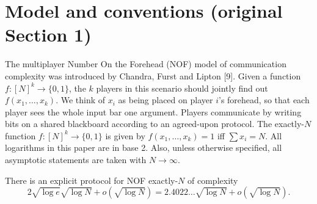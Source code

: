\section*{Model and conventions (original Section 1)}
The multiplayer Number On the Forehead (NOF) model of communication complexity was introduced by Chandra, Furst and Lipton [9]. Given a function $f:[N]^k\to\{0,1\}$, the $k$ players in this scenario should jointly find out $f(x_1,\ldots,x_k)$. We think of $x_i$ as being placed on player $i$'s forehead, so that each player sees the whole input bar one argument. Players communicate by writing bits on a shared blackboard according to an agreed-upon protocol.
The exactly-$N$ function $f:[N]^k\to\{0,1\}$ is given by $f(x_1,\ldots,x_k)=1$ iff $\sum x_i=N$.
All logarithms in this paper are in base 2. Also, unless otherwise specified, all asymptotic statements are taken with $N\to\infty$.
\begin{theorem}\label{main}
There is an explicit protocol for NOF exactly-$N$ of complexity
\begin{equation}\label{eq:main}
2\sqrt{\log e}\sqrt{\log N}+o(\sqrt{\log N})=2.4022\ldots\sqrt{\log N}+o(\sqrt{\log N}).\tag{2}
\end{equation}
\end{theorem}
